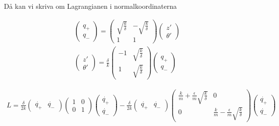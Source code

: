 \documentclass[a4paper]{article}
\begin{document}
Då kan vi skriva om Lagrangianen i normalkoordinaterna

\begin{align*}
    \begin{pmatrix} q_+ \\ q_- \end{pmatrix} = \begin{pmatrix} \sqrt{\frac{k}{\delta}} & -\sqrt{\frac{k}{\delta}} \\ 1 & 1 \end{pmatrix} \begin{pmatrix} z' \\ \theta' \end{pmatrix}\\
    \begin{pmatrix}z' \\ \theta'\end{pmatrix} = \frac{\delta}{k}\begin{pmatrix} -1 & \sqrt{\frac{k}{\delta}} \\ 1 & \sqrt{\frac{k}{\delta}} \end{pmatrix} \begin{pmatrix} q_+ \\ q_- \end{pmatrix}
\end{align*}


\begin{align*}
        L = \frac{\delta}{2k} \begin{pmatrix} \dot{q_+} & \dot{q_-} \end{pmatrix} \begin{pmatrix} 1 & 0 \\ 0 & 1 \end{pmatrix} \begin{pmatrix} \dot{q_+} \\ \dot{q_-} \end{pmatrix} - \frac{\delta}{2k} \begin{pmatrix} \dot{q_+} & \dot{q_-} \end{pmatrix} \begin{pmatrix} \frac{k}{m} + \frac{\epsilon}{m}\sqrt{\frac{k}{\delta}} & 0 \\ 0 & \frac{k}{m} - \frac{\epsilon}{m}\sqrt{\frac{k}{\delta}} \end{pmatrix} \begin{pmatrix} \dot{q_+} \\ \dot{q_-} \end{pmatrix}  
\end{align*}
\end{document}

